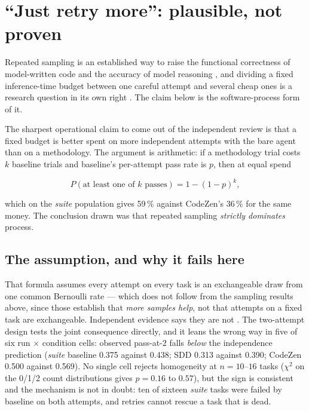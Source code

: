 \documentclass[11pt,a4paper]{article}
\begin{document}
\clearpage
\section{``Just retry more'': plausible, not proven}
\label{sec:bestofn}

Repeated sampling is an established way to raise the functional correctness of model-written
code \citep{chen2021codex} and the accuracy of model reasoning
\citep{wang2023selfconsistency}, and dividing a fixed inference-time budget between one careful
attempt and several cheap ones is a research question in its own right
\citep{snell2024scaling}. The claim below is the software-process form of it.

The sharpest operational claim to come out of the independent review is that a fixed budget is
better spent on more independent attempts with the bare agent than on a methodology. The
argument is arithmetic: if a methodology trial costs $k$ baseline trials and baseline's
per-attempt pass rate is $p$, then at equal spend

\[ P(\text{at least one of } k \text{ passes}) = 1 - (1-p)^k, \]

which on the \emph{suite} population gives 59\,\% against CodeZen's 36\,\% for the same money.
The conclusion drawn was that repeated sampling \emph{strictly dominates} process.

\subsection{The assumption, and why it fails here}

That formula assumes every attempt on every task is an exchangeable draw from one common
Bernoulli rate --- which does not follow from the sampling results above, since those
establish that \emph{more samples help}, not that attempts on a fixed task are exchangeable.
Independent evidence says they are not \citep{bjarnason2026randomness}. The two-attempt design
tests the joint consequence directly, and it leans the wrong way in five of six
run $\times$ condition cells: observed pass-at-2 falls \emph{below}
the independence prediction (\emph{suite} baseline 0.375 against 0.438; SDD 0.313 against
0.390; CodeZen 0.500 against 0.569). No single cell rejects homogeneity at $n = 10$--$16$
tasks ($\chi^2$ on the 0/1/2 count distributions gives $p = 0.16$ to $0.57$), but the sign is
consistent and the mechanism is not in doubt: ten of sixteen \emph{suite} tasks were failed by
baseline on both attempts, and retries cannot rescue a task that is dead.
\end{document}
